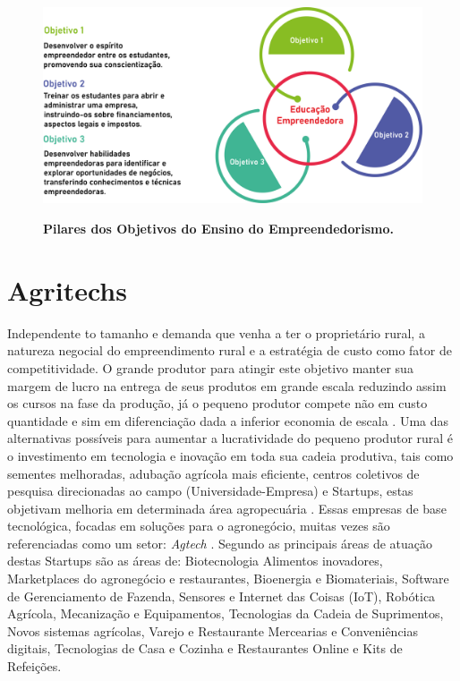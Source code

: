 \begin{figure}[htb]
\centering
\caption{\textbf{Pilares dos Objetivos do Ensino do Empreendedorismo.}}
\includegraphics[scale=0.3]{Imagens/figura2.png}
\label{figura_2}
\end{figure}

\section{Agritechs}

Independente to tamanho e demanda que venha a ter o proprietário rural, a natureza negocial do empreendimento rural e a estratégia de custo como fator de competitividade. O grande produtor para atingir este objetivo manter sua margem de lucro na entrega de seus produtos em grande escala reduzindo assim os cursos na fase da produção, já o pequeno produtor compete não em custo quantidade e sim em diferenciação dada a inferior economia de escala \cite{soares_relacao_2017}. Uma das alternativas possíveis para aumentar a lucratividade do pequeno produtor rural é o investimento em tecnologia e inovação em toda sua cadeia produtiva, tais como sementes melhoradas, adubação agrícola mais eficiente, centros coletivos de pesquisa direcionadas ao campo (Universidade-Empresa) \cite{bochi_dorneles_coletivos_2014, gomes_inovacao_2014} e Startups, estas objetivam melhoria em determinada área agropecuária \cite{junior_agtechs:_2019}. Essas empresas de base tecnológica, focadas em soluções para o agronegócio, muitas vezes são referenciadas como um setor: \textit{Agtech} \cite{blanco_agtechs:_2019}. Segundo  as principais áreas de atuação destas Startups são as áreas de: Biotecnologia Alimentos inovadores, Marketplaces do agronegócio e restaurantes, Bioenergia e Biomateriais, Software de Gerenciamento de Fazenda, Sensores e Internet das Coisas (IoT), Robótica Agrícola, Mecanização e Equipamentos, Tecnologias da Cadeia de Suprimentos, Novos sistemas agrícolas, Varejo e Restaurante Mercearias e Conveniências digitais, Tecnologias de Casa e Cozinha e Restaurantes Online e Kits de Refeições.




